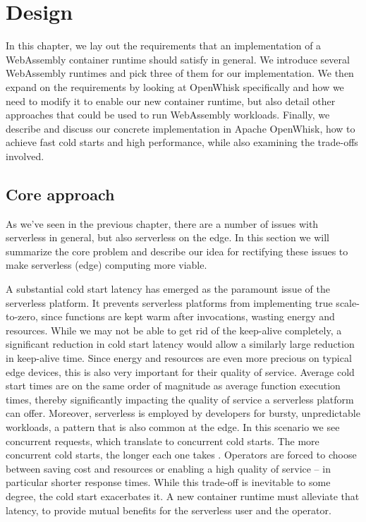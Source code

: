 \chapter{Design}
\label{chapter:design}

In this chapter, we lay out the requirements that an implementation of a WebAssembly container runtime should satisfy in general. We introduce several WebAssembly runtimes and pick three of them for our implementation. We then expand on the requirements by looking at OpenWhisk specifically and how we need to modify it to enable our new container runtime, but also detail other approaches that could be used to run WebAssembly workloads. Finally, we describe and discuss our concrete implementation in Apache OpenWhisk, how to achieve fast cold starts and high performance, while also examining the trade-offs involved.

\section{Core approach}

As we've seen in the previous chapter, there are a number of issues with serverless in general, but also serverless on the edge. In this section we will summarize the core problem and describe our idea for rectifying these issues to make serverless (edge) computing more viable.

A substantial cold start latency has emerged as the paramount issue of the serverless platform. It prevents serverless platforms from implementing true scale-to-zero, since functions are kept warm after invocations, wasting energy and resources. While we may not be able to get rid of the keep-alive completely, a significant reduction in cold start latency would allow a similarly large reduction in keep-alive time. Since energy and resources are even more precious on typical edge devices, this is also very important for their quality of service.
Average cold start times are on the same order of magnitude as average function execution times, thereby significantly impacting the quality of service a serverless platform can offer. Moreover, serverless is employed by developers for bursty, unpredictable workloads, a pattern that is also common at the edge. In this scenario we see concurrent requests, which translate to concurrent cold starts. The more concurrent cold starts, the longer each one takes \cite{Cui2018}.
Operators are forced to choose between saving cost and resources or enabling a high quality of service -- in particular shorter response times. While this trade-off is inevitable to some degree, the cold start exacerbates it. A new container runtime must alleviate that latency, to provide mutual benefits for the serverless user and the operator.


